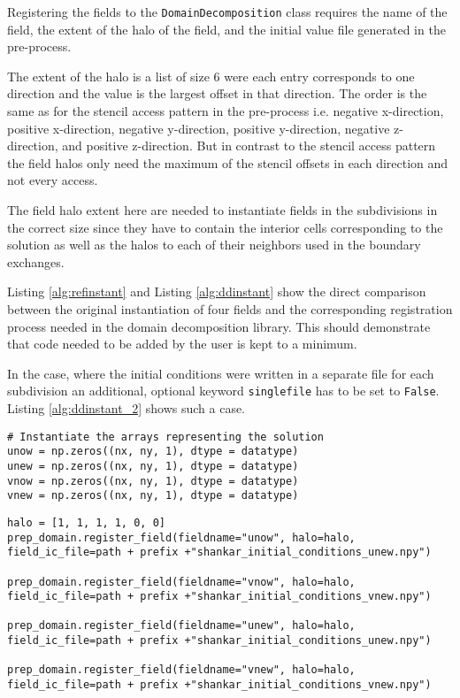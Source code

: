 Registering the fields to the \texttt{DomainDecomposition} class requires the name of the field, the extent of the halo of the field, and the initial value file generated in the pre-process.

The extent of the halo is a list of size 6 were each entry corresponds to one direction and the value is the largest offset in that direction.
The order is the same as for the stencil access pattern in the pre-process i.e. negative x-direction, positive x-direction, negative y-direction, positive y-direction, negative z-direction, and positive z-direction.
But in contrast to the stencil access pattern the field halos only need the maximum of the stencil offsets in each direction and not every access.

The field halo extent here are needed to instantiate fields in the subdivisions in the correct size since they have to contain the interior cells corresponding to the solution as well as the halos to each of their neighbors used in the boundary exchanges.

Listing \ref{alg:refinstant} and Listing \ref{alg:ddinstant} show the direct comparison between the original instantiation of four fields and the corresponding registration process needed in the domain decomposition library.
This should demonstrate that code needed to be added by the user is kept to a minimum.

In the case, where the initial conditions were written in a separate file for each subdivision an additional, optional keyword \texttt{singlefile} has to be set to \texttt{False}.
Listing \ref{alg:ddinstant_2} shows such a case.

\begin{lstlisting}[caption={Example code for the original user field instantiation.},captionpos=b, label={alg:refinstant}, float, floatplacement=H]
# Instantiate the arrays representing the solution
unow = np.zeros((nx, ny, 1), dtype = datatype)
unew = np.zeros((nx, ny, 1), dtype = datatype)
vnow = np.zeros((nx, ny, 1), dtype = datatype)
vnew = np.zeros((nx, ny, 1), dtype = datatype)
\end{lstlisting} 

\begin{lstlisting}[caption={Example code for the same field instantiation using the domain decomposition library.},captionpos=b, label={alg:ddinstant_2}, float, floatplacement=H]
halo = [1, 1, 1, 1, 0, 0]
prep_domain.register_field(fieldname="unow", halo=halo, field_ic_file=path + prefix +"shankar_initial_conditions_unew.npy")

prep_domain.register_field(fieldname="vnow", halo=halo, field_ic_file=path + prefix +"shankar_initial_conditions_vnew.npy")

prep_domain.register_field(fieldname="unew", halo=halo, field_ic_file=path + prefix +"shankar_initial_conditions_unew.npy")

prep_domain.register_field(fieldname="vnew", halo=halo, field_ic_file=path + prefix +"shankar_initial_conditions_vnew.npy")
\end{lstlisting}

